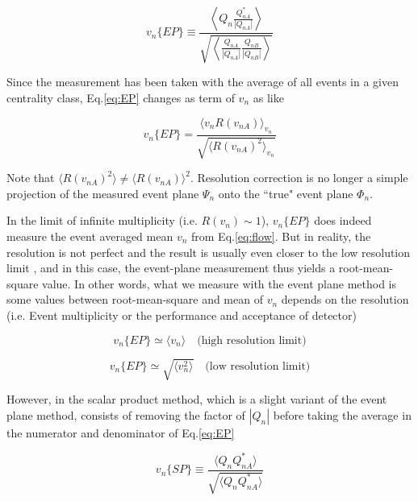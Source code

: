 	\begin{equation}
		v_n\{EP\} \equiv \frac{\left \langle Q_n \frac{Q_{nA}^*}{|Q_{nA}|} \right \rangle }{\sqrt{\left \langle  \frac{Q_{nA}}{|Q_{nA}|}  \frac{Q_{nB}}{|Q_{nB}|} \right \rangle }}
		\label{eq:EP}
	\end{equation}
	\smallskip
	
	Since the measurement has been taken with the average of all events in a given centrality class, Eq.\ref{eq:EP} changes as term of $v_n$ as like
	
	\begin{equation}
		v_n\{EP\} = \frac{\langle v_n R(v_{nA})\rangle _{v_n}}{\sqrt{\langle R(v_{nA})^2 \rangle _{v_n} }}
	\end{equation}
	\smallskip 
	
	Note that $\langle R(v_{nA})^2 \rangle \neq \langle R(v_{nA})\rangle ^2$. Resolution correction is no longer a simple projection of the measured event plane $\Psi_n$ onto the ``true" event plane $\Phi_n$.
	
	In the limit of infinite multiplicity (i.e. $R(v_n) \sim 1$), $v_n\{EP\}$ does indeed measure the event averaged mean $v_n$ from Eq.\ref{eq:flow}. But in reality, the resolution is not perfect and the result is usually even closer to the low resolution limit \cite{Alver:2008zza}, and in this case, the event-plane measurement thus yields a root-mean-square value. In other words, what we measure with the event plane method is some values between root-mean-square and mean of $v_n$ depends on the resolution (i.e. Event multiplicity or the performance and acceptance of detector)
	
	\begin{equation}
		v_n\{EP\} \simeq \langle v_n \rangle \quad \text{(high resolution limit)}
	\end{equation}

	\begin{equation}
		v_n\{EP\} \simeq \sqrt{\langle v_n^2 \rangle}  \quad \text{(low resolution limit)}
	\end{equation}
	\smallskip
	
	However, in the scalar product method, which is a slight variant of the event plane method, consists of removing the factor of $|Q_n|$ before taking the average in the numerator and denominator of Eq.\ref{eq:EP}
	
	
	\begin{equation}
		v_n\{SP\} \equiv \frac{\langle Q_n Q_{nA}^*\rangle}{\sqrt{\langle Q_n Q_{nA}^*\rangle}}
	\end{equation}
	

